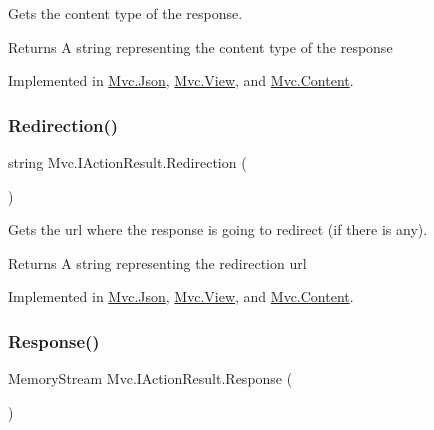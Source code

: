 Gets the content type of the response. 

\begin{DoxyReturn}{Returns}
A string representing the content type of the response
\end{DoxyReturn}


Implemented in \hyperlink{class_mvc_1_1_json_aa2572df4640e171276244cbb14070284}{Mvc.\+Json}, \hyperlink{class_mvc_1_1_view_a0b14b3b8e85c97ada45a32dfcc30f157}{Mvc.\+View}, and \hyperlink{class_mvc_1_1_content_a5d384ef7d466dfc88ccf1eb7f10728ad}{Mvc.\+Content}.

\mbox{\label{interface_mvc_1_1_i_action_result_a036707da116ea300eae90e105b8d1ced}} 
\subsubsection{\texorpdfstring{Redirection()}{Redirection()}}
{\footnotesize\ttfamily string Mvc.\+I\+Action\+Result.\+Redirection (\begin{DoxyParamCaption}{ }\end{DoxyParamCaption})}



Gets the url where the response is going to redirect (if there is any). 

\begin{DoxyReturn}{Returns}
A string representing the redirection url
\end{DoxyReturn}


Implemented in \hyperlink{class_mvc_1_1_json_af8cd874b2a4c9692f0200bde97d40c87}{Mvc.\+Json}, \hyperlink{class_mvc_1_1_view_a6628a16ae93e0269d91413a3a38d0132}{Mvc.\+View}, and \hyperlink{class_mvc_1_1_content_ae4eba27dbea637dc61bc4b681f731545}{Mvc.\+Content}.

\mbox{\label{interface_mvc_1_1_i_action_result_a7cf7423071384c7b2bac75a5f4d6e25c}} 
\subsubsection{\texorpdfstring{Response()}{Response()}}
{\footnotesize\ttfamily Memory\+Stream Mvc.\+I\+Action\+Result.\+Response (\begin{DoxyParamCaption}{ }\end{DoxyParamCaption})}



